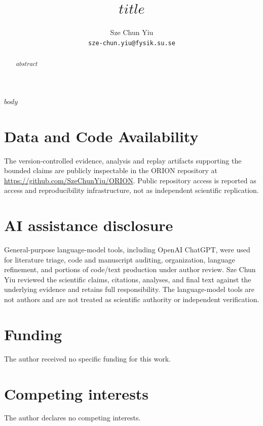 \documentclass[11pt]{article}
\title{$title$}
\author{Sze Chun Yiu\\\texttt{sze-chun.yiu@fysik.su.se}}
\date{}
\begin{document}
\maketitle

\begin{abstract}
$abstract$
\end{abstract}

$body$

\section*{Data and Code Availability}
The version-controlled evidence, analysis and replay artifacts supporting the bounded
claims are publicly inspectable in the ORION repository at
\url{https://github.com/SzeChunYiu/ORION}. Public repository access is reported as
access and reproducibility infrastructure, not as independent scientific replication.

\section*{AI assistance disclosure}
General-purpose language-model tools, including OpenAI ChatGPT, were used for
literature triage, code and manuscript auditing, organization, language refinement,
and portions of code/text production under author review. Sze Chun Yiu reviewed the
scientific claims, citations, analyses, and final text against the underlying evidence
and retains full responsibility. The language-model tools are not authors and are not
treated as scientific authority or independent verification.

\section*{Funding}
The author received no specific funding for this work.

\section*{Competing interests}
The author declares no competing interests.



\end{document}
